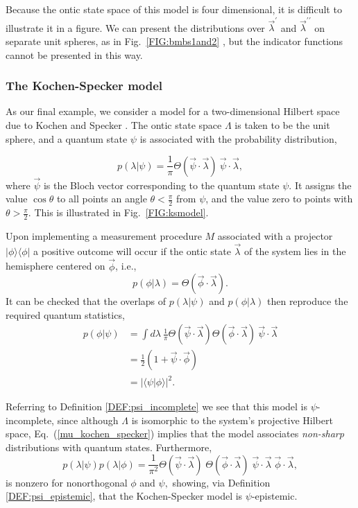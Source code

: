 \documentclass[aps,nofootinbib,12pt]{revtex4}
\begin{document}
Because the ontic state space of this model is four dimensional, it
is difficult to illustrate it in a figure. We can present the
distributions over $\vec{\lambda}^{\prime}$ and
$\vec{\lambda}^{\prime\prime}$ on separate unit spheres, as in
Fig.~\ref{FIG:bmbs1and2} , but the indicator functions cannot be
presented in this way.


\subsubsection{The Kochen-Specker model \label{SEC:example_ksmodel}}

As our final example, we consider a model for a two-dimensional
Hilbert space due to Kochen and Specker \cite{Ks}. The ontic state
space $\Lambda$ is taken to be the unit sphere, and a quantum state
$\psi$ is associated with the probability distribution,

\begin{equation}
p(\lambda|\psi)=\frac{1}{\pi}\Theta(\vec{\psi}\cdot\vec{\lambda})\:\vec{\psi
}\cdot\vec{\lambda}, \label{mu_kochen_specker}
\end{equation}
where $\vec{\psi}$ is the Bloch vector corresponding to the quantum
state $\psi$. It assigns the value $\cos{\theta}$ to all points an
angle $\theta<\frac{\pi}{2}$ from $\psi $, and the value zero to
points with $\theta>\frac{\pi}{2}$. This is illustrated in
Fig.~\ref{FIG:ksmodel}.

Upon implementing a measurement procedure $M$ associated with a
projector $|\phi\rangle\langle\phi|$ a positive outcome will occur
if the ontic state $\vec{\lambda}$ of the system lies in the
hemisphere centered on $\vec{\phi}$, i.e.,
\begin{equation}
p(\phi|\lambda)=\Theta(\vec{\phi}\cdot\vec{\lambda}).
\end{equation}
It can be checked that the overlaps of $p(\lambda|\psi)$ and
$p(\phi|\lambda)$ then reproduce the required quantum statistics,
\begin{align}
p(\phi|\psi)  & =\int{d}\lambda\:\frac{1}{\pi}\Theta(\vec{\psi}\cdot
\vec{\lambda})\Theta(\vec{\phi}\cdot\vec{\lambda})\:\vec{\psi}\cdot
\vec{\lambda}\nonumber\\
&  =\frac{1}{2}(1+\vec{\psi}\cdot\vec{\phi})\nonumber\\
&  =\left|  \langle\psi|\phi\rangle\right|  ^{2}.
\end{align}

Referring to Definition \ref{DEF:psi_incomplete} we see that this
model is $\psi$-incomplete, since although $\Lambda$ is isomorphic
to the system's projective Hilbert space,
Eq.~(\ref{mu_kochen_specker}) implies that the model associates
\textit{non-sharp} distributions with quantum states. Furthermore,
\[
p(\lambda|\psi)p(\lambda|\phi)=\frac{1}{\pi^{2}}\Theta(\vec{\psi}\cdot
\vec{\lambda})\;\Theta(\vec{\phi}\cdot\vec{\lambda})\;\vec{\psi}\cdot
\vec{\lambda}\;\vec{\phi}\cdot\vec{\lambda},
\]
is nonzero for nonorthogonal $\phi$ and $\psi,$ showing, via
Definition \ref{DEF:psi_epistemic}, that the Kochen-Specker model is
$\psi$-epistemic.
\end{document}
